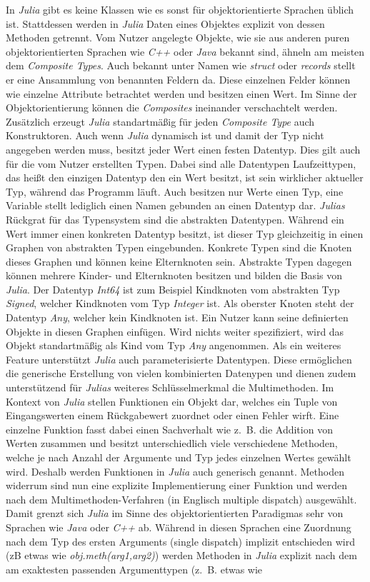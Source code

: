 \documentclass[proseminar,german,utf8]{zihpub}
\begin{document}
In \textit{Julia} gibt es keine Klassen wie es sonst für objektorientierte Sprachen üblich ist. Stattdessen werden in \textit{Julia} Daten eines Objektes explizit von dessen Methoden getrennt. Vom Nutzer angelegte Objekte, wie sie aus anderen puren objektorientierten Sprachen wie \textit{C++} oder \textit{Java} bekannt sind, ähneln am meisten dem \textit{Composite Types}. Auch bekannt unter Namen wie \textit{struct} oder \textit{records} stellt er eine Ansammlung von benannten Feldern da. Diese einzelnen Felder können wie einzelne Attribute betrachtet werden und besitzen einen Wert. Im Sinne der Objektorientierung können die \textit{Composites} ineinander verschachtelt werden. Zusätzlich erzeugt \textit{Julia} standartmäßig für jeden \textit{Composite Type} auch Konstruktoren. Auch wenn \textit{Julia} dynamisch ist und damit der Typ nicht angegeben werden muss, besitzt jeder Wert einen festen Datentyp. Dies gilt auch für die vom Nutzer erstellten Typen. Dabei sind alle Datentypen Laufzeittypen, das heißt den einzigen Datentyp den ein Wert besitzt, ist sein wirklicher aktueller Typ, während das Programm läuft. Auch besitzen nur Werte einen Typ, eine Variable stellt lediglich einen Namen gebunden an einen Datentyp dar. \textit{Julias} Rückgrat für das Typensystem sind die abstrakten Datentypen. Während ein Wert immer einen konkreten Datentyp besitzt, ist dieser Typ gleichzeitig in einen Graphen von abstrakten Typen eingebunden. Konkrete Typen sind die Knoten dieses Graphen und können keine Elternknoten sein. Abstrakte Typen dagegen können mehrere Kinder- und Elternknoten besitzen und bilden die Basis von \textit{Julia}. Der Datentyp \textit{Int64} ist zum Beispiel Kindknoten vom abstrakten Typ \textit{Signed}, welcher Kindknoten vom Typ \textit{Integer} ist. Als oberster Knoten steht der Datentyp \textit{Any}, welcher kein Kindknoten ist. Ein Nutzer kann seine definierten Objekte in diesen Graphen einfügen. Wird nichts weiter spezifiziert, wird das Objekt standartmäßig als Kind vom Typ \textit{Any} angenommen. Als ein weiteres Feature unterstützt \textit{Julia} auch parameterisierte Datentypen. Diese ermöglichen die generische Erstellung von vielen kombinierten Datenypen und dienen zudem unterstützend für \textit{Julias} weiteres Schlüsselmerkmal \-  die Multimethoden. Im Kontext von \textit{Julia} stellen Funktionen ein Objekt dar, welches ein Tuple von Eingangswerten einem Rückgabewert zuordnet oder einen Fehler wirft. Eine einzelne Funktion fasst dabei einen Sachverhalt wie z.~B. die Addition von Werten zusammen und besitzt unterschiedlich viele verschiedene Methoden, welche je nach Anzahl der Argumente und Typ jedes einzelnen Wertes gewählt wird. Deshalb werden Funktionen in \textit{Julia} auch generisch genannt. Methoden widerrum sind nun eine explizite Implementierung einer Funktion und werden nach dem Multimethoden-Verfahren (in Englisch multiple dispatch) ausgewählt. Damit grenzt sich \textit{Julia} im Sinne des objektorientierten Paradigmas sehr von Sprachen wie \textit{Java} oder \textit{C++} ab. Während in diesen Sprachen eine Zuordnung nach dem Typ des ersten Arguments (single dispatch) implizit entschieden wird (zB etwas wie \textit{obj.meth(arg1,arg2)}) werden Methoden in \textit{Julia} explizit nach dem am exaktesten passenden Argumenttypen (z.~B. etwas wie 
\end{document}
